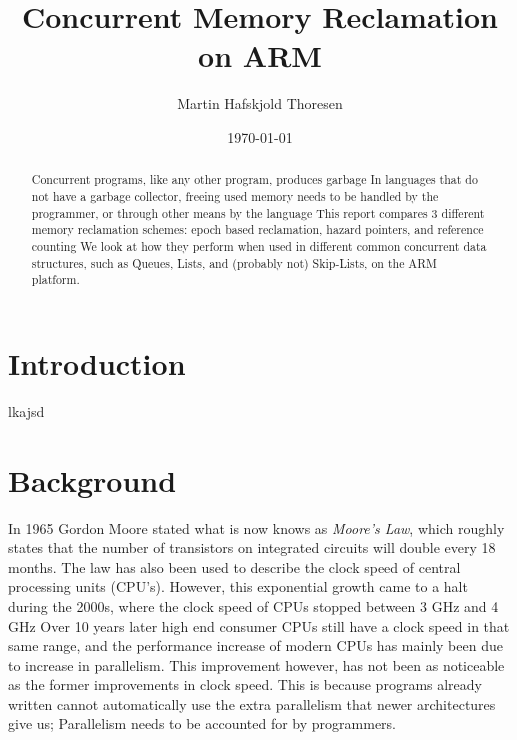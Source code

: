 \documentclass[b5paper]{report}
\begin{document}
\title{Concurrent Memory Reclamation on ARM}
\author{Martin Hafskjold Thoresen}
\date{\today}
\maketitle



\begin{abstract}
  Concurrent programs, like any other program, produces garbage In languages
  that do not have a garbage collector, freeing used memory needs to be
  handled by the programmer, or through other means by the language This
  report compares 3 different memory reclamation schemes: epoch based
  reclamation, hazard pointers, and reference counting We look at how they
  perform when used in different common concurrent data structures, such as
  Queues, Lists, and (probably not) Skip-Lists, on the ARM platform.
\end{abstract}

\chapter{Introduction}

lkajsd

\tableofcontents

\chapter{Background}

In 1965 Gordon Moore stated what is now knows as \emph{Moore's Law}, which
roughly states that the number of transistors on integrated circuits will
double every 18 months. The law has also been used to describe the clock speed
of central processing units (CPU's). However, this exponential growth came to a
halt during the 2000s, where the clock speed of CPUs stopped between 3 GHz and
4 GHz Over 10 years later high end consumer CPUs still have a clock speed in
that same range, and the performance increase of modern CPUs has mainly been
due to increase in parallelism. This improvement however, has not been as
noticeable as the former improvements in clock speed. This is because programs
already written cannot automatically use the extra parallelism that newer
architectures give us; Parallelism needs to be accounted for by programmers.
\end{document}
